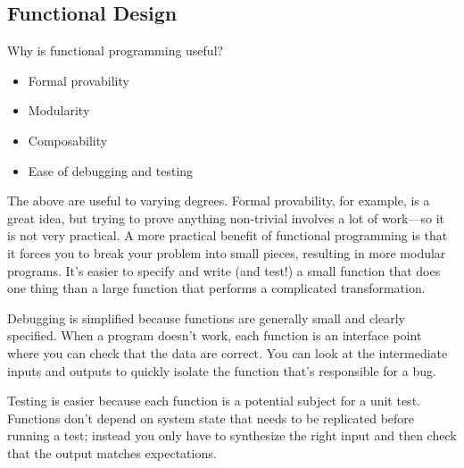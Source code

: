 \documentclass[ignorenonframetext,red]{beamer}
\begin{document}
\subsection{Functional Design}
\begin{frame}
\noindent Why is functional programming useful?
\begin{itemize}
\pause \item Formal provability
\pause \item Modularity
\pause \item Composability
\pause \item Ease of debugging and testing
\end{itemize}
\end{frame}

\noindent The above are useful to varying degrees. Formal provability, for example, is a great idea, but trying to prove anything non-trivial involves a lot of work---so it is not very practical. A more practical benefit of functional programming is that it forces you to break your problem into small pieces, resulting in more modular programs.  It’s easier to specify and write (and test!) a small function that does one thing than a large function that performs a complicated transformation.

Debugging is simplified because functions are generally small and clearly specified. When a program doesn’t work, each function is an interface point where you can check that the data are correct. You can look at the intermediate inputs and outputs to quickly isolate the function that’s responsible for a bug.

Testing is easier because each function is a potential subject for a unit test. Functions don’t depend on system state that needs to be replicated before running a test; instead you only have to synthesize the right input and then check that the output matches expectations.
\end{document}
